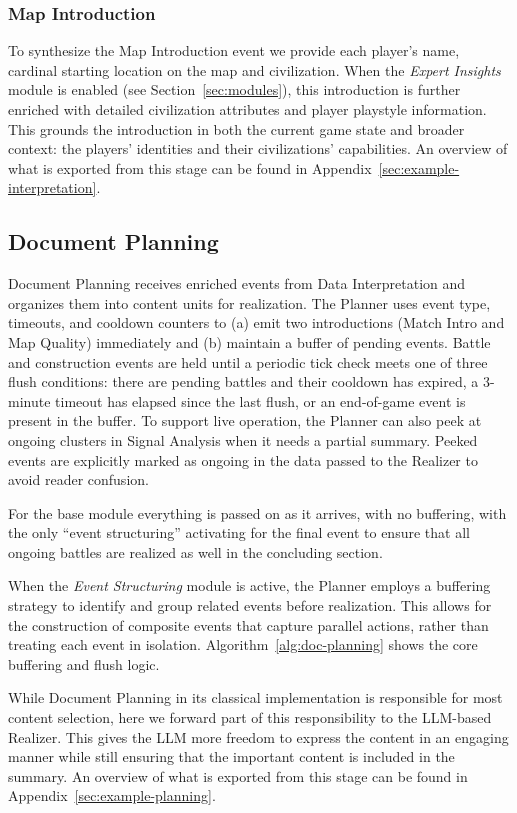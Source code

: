 \subsubsection{Map Introduction}
To synthesize the Map Introduction event we provide each player's name, cardinal starting location on the map and civilization. When the \textit{Expert Insights} module is enabled (see Section~\ref{sec:modules}), this introduction is further enriched with detailed civilization attributes and player playstyle information. This grounds the introduction in both the current game state and broader context: the players' identities and their civilizations' capabilities. An overview of what is exported from this stage can be found in Appendix~\ref{sec:example-interpretation}.

\subsection{Document Planning}
Document Planning receives enriched events from Data Interpretation and organizes them into content units for realization. The Planner uses event type, timeouts, and cooldown counters to (a) emit two introductions (Match Intro and Map Quality) immediately and (b) maintain a buffer of pending events. Battle and construction events are held until a periodic tick check meets one of three flush conditions: there are pending battles and their cooldown has expired, a 3-minute timeout has elapsed since the last flush, or an end-of-game event is present in the buffer.
To support live operation, the Planner can also peek at ongoing clusters in Signal Analysis when it needs a partial summary. Peeked events are explicitly marked as ongoing in the data passed to the Realizer to avoid reader confusion.

For the base module everything is passed on as it arrives, with no buffering, with the only ``event structuring'' activating for the final event to ensure that all ongoing battles are realized as well in the concluding section.

When the \textit{Event Structuring} module is active, the Planner employs a buffering strategy to identify and group related events before realization. This allows for the construction of composite events that capture parallel actions, rather than treating each event in isolation. Algorithm~\ref{alg:doc-planning} shows the core buffering and flush logic.

While Document Planning in its classical implementation is responsible for most content selection, here we forward part of this responsibility to the LLM-based Realizer. This gives the LLM more freedom to express the content in an engaging manner while still ensuring that the important content is included in the summary. An overview of what is exported from this stage can be found in Appendix~\ref{sec:example-planning}.

